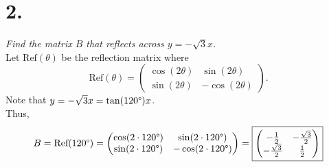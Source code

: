 \documentclass[12pt]{article}
\begin{document}
\section*{2.}
\textit{Find the matrix $B$ that reflects across $y = -\sqrt{3}x$.}
\\[\baselineskip]
Let $\text{Ref}(\theta)$ be the reflection matrix where
\begin{equation*}
	\text{Ref}(\theta) =
	\begin{pmatrix}
		\cos(2 \theta) & \sin(2 \theta) \\
		\sin(2 \theta) & -\cos(2 \theta)
	\end{pmatrix}
	.
\end{equation*}
Note that $y = -\sqrt{3}x = \tan(120 \degree)x$. \\
Thus,
\begin{equation*}
	B = \text{Ref}(120 \degree) =
	\begin{pmatrix}
		\cos(2 \cdot 120 \degree) & \sin(2 \cdot 120 \degree) \\
		\sin(2 \cdot 120 \degree) & -\cos(2 \cdot 120 \degree)
	\end{pmatrix}
	=
	\boxed{
		\begin{pmatrix}
			-\frac{1}{2} & -\frac{\sqrt{3}}{2} \\
			-\frac{\sqrt{3}}{2} & \frac{1}{2}
		\end{pmatrix}
	}
\end{equation*}
\newpage
\end{document}
